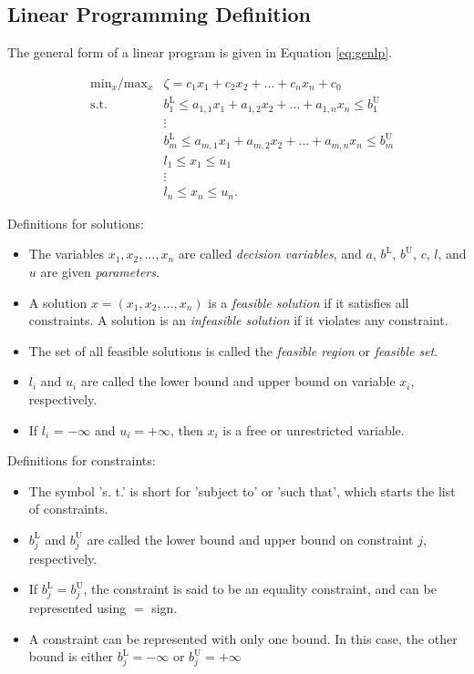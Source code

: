 \subsection{Linear Programming Definition}

The general form of a linear program is given 
in Equation \ref{eq:genlp}.

\begin{align}
    &\text{min}_{x} / \text{max}_x &\zeta = c_1x_1 + c_2x_2 + \dots + c_nx_n + c_0 \\
    &\text{s.t.} &b_1^{\text{L}} \leq a_{1,1} x_1 + a_{1,2}x_2 + \dots + a_{1,n}x_n \leq b_1^{\text{U}} \\
    &&\vdots \\
    &&b_m^{\text{L}} \leq a_{m,1}x_1 + a_{m,2}x_2 + \dots + a_{m,n}x_n \leq b_m^{\text{U}} \\
    &&l_1 \leq x_1 \leq u_1 \\
    &&\vdots \\
    &&l_n \leq x_n \leq u_n.
\end{align}
\label{eq:genlp}

Definitions for solutions:
\begin{itemize}
    \item The variables $x_1, x_2, \dots, x_n$
        are called \emph{decision variables},
        and $a$, $b^{\text{L}}$, $b^{\text{U}}$,
        $c$, $l$, and $u$ are given \emph{parameters}.
    \item A solution $x = (x_1, x_2, \dots, x_n)$ is a \emph{feasible solution} if it satisfies all
            constraints. A solution is an \emph{infeasible solution} if it violates
            any constraint.
    \item The set of all feasible solutions is called the \emph{feasible region} or
        \emph{feasible set}.
    \item $l_i$ and $u_i$ are called the lower bound and upper bound on variable
        $x_i$, respectively.
    \item If $l_i$ = $-\infty$ and $u_i = +\infty$, 
        then $x_i$ is a free or unrestricted variable.
\end{itemize}

Definitions for constraints:
\begin{itemize}
    \item The symbol 's. t.' is short for 'subject to' 
    or 'such that', which starts
    the list of constraints.
    \item $b_j^{\text{L}}$ and $b_j^{\text{U}}$ are called 
    the lower bound and upper bound on
    constraint $j$, respectively.
    \item If $b_j^{\text{L}} = b_j^{\text{U}}$, the constraint is said to be an equality constraint, and
    can be represented using $=$ sign.
    \item A constraint can be represented with only one bound. In this case,
    the other bound is either $b_j^{\text{L}} = -\infty$ or 
    $b_j^{\text{U}} = +\infty$
\end{itemize}

